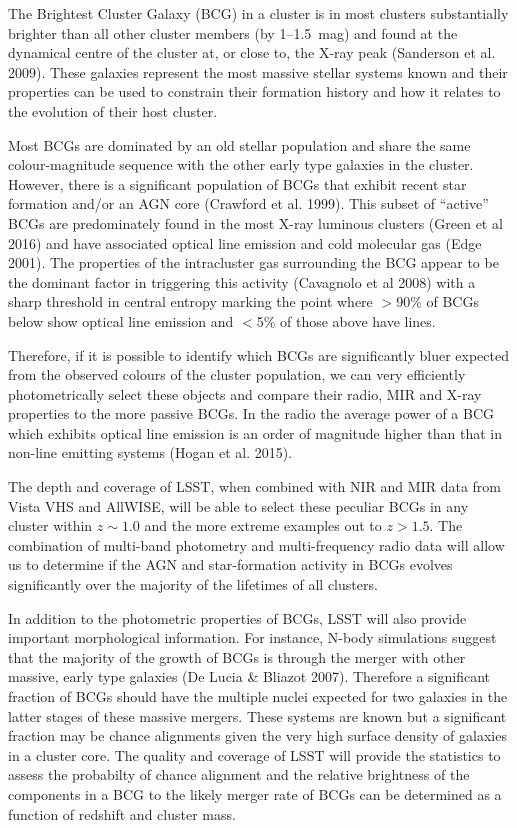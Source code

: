 \documentclass[a4paper,11pt]{article}
\begin{document}
\noindent
The Brightest Cluster Galaxy (BCG) in a cluster is in most clusters
substantially brighter than all other cluster members (by 1--1.5~mag)
and found at the dynamical centre of the cluster at, or close to, the
X-ray peak (Sanderson et al. 2009). These galaxies represent the most
massive stellar systems known and their properties can be used to
constrain their formation history and how it relates to the evolution
of their host cluster.

Most BCGs are dominated by an old stellar population and share the
same colour-magnitude sequence with the other early type galaxies in
the cluster. However, there is a significant population of BCGs that
exhibit recent star formation and/or an AGN core (Crawford et
al. 1999).  This subset of ``active'' BCGs are predominately found in
the most X-ray luminous clusters (Green et al 2016) and have
associated optical line emission and cold molecular gas (Edge
2001). The properties of the intracluster gas surrounding the BCG
appear to be the dominant factor in triggering this activity
(Cavagnolo et al 2008) with a sharp threshold in central entropy
marking the point where $>$90\% of BCGs below show optical line
emission and $<$5\% of those above have lines.

Therefore, if it is possible to identify which BCGs are significantly
bluer expected from the observed colours of the cluster population, we
can very efficiently photometrically select these objects and compare
their radio, MIR and X-ray properties to the more passive BCGs. In the
radio the average power of a BCG which exhibits optical line emission
is an order of magnitude higher than that in non-line emitting systems
(Hogan et al. 2015).

The depth and coverage of LSST, when combined with NIR and MIR data
from Vista VHS and AllWISE, will be able to select these peculiar BCGs
in any cluster within $z\sim 1.0$ and the more extreme examples out to
$z>1.5$. The combination of multi-band photometry and multi-frequency
radio data will allow us to determine if the AGN and star-formation
activity in BCGs evolves significantly over the majority of the
lifetimes of all clusters.

In addition to the photometric properties of BCGs, LSST will also
provide important morphological information. For instance, N-body
simulations suggest that the majority of the growth of BCGs is through
the merger with other massive, early type galaxies (De Lucia \&
Bliazot 2007). Therefore a significant fraction of BCGs should have
the multiple nuclei expected for two galaxies in the latter stages of
these massive mergers. These systems are known but a significant
fraction may be chance alignments given the very high surface density
of galaxies in a cluster core. The quality and coverage of LSST will
provide the statistics to assess the probabilty of chance alignment
and the relative brightness of the components in a BCG to the likely
merger rate of BCGs can be determined as a function of redshift and
cluster mass.
\end{document}

